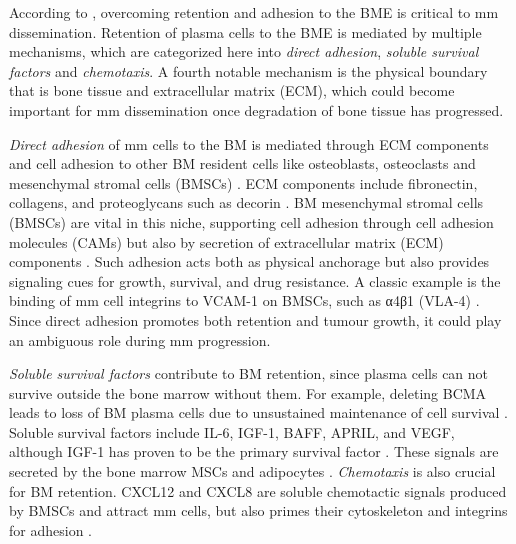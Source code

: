%
\label{sec:intro_myeloma_retention}%
According to \citet{zeissigTumourDisseminationMultiple2020}, overcoming
retention and adhesion to the BME is critical to \ac{mm} dissemination. Retention of
plasma cells to the BME is mediated by multiple mechanisms, which are
categorized here into \emph{direct adhesion}, \emph{soluble survival factors}
and \emph{chemotaxis}. A fourth notable mechanism is the physical boundary that
is bone tissue and extracellular matrix (ECM), which could become important for
\ac{mm} dissemination once degradation of bone tissue has progressed.

\emph{Direct adhesion} of \ac{mm} cells to the BM is mediated through ECM components
and cell adhesion to other BM resident cells like osteoblasts, osteoclasts and
mesenchymal stromal cells (BMSCs) \cite{bouzerdanAdhesionMoleculesMultiple2022}.
ECM components include fibronectin, collagens, and proteoglycans such as decorin
\cite{huDecorinmediatedSuppressionTumorigenesis2021,
    huangHigherDecorinLevels2015,katzAdhesionMoleculesLifelines2010,
    kiblerAdhesiveInteractionsHuman1998}. BM mesenchymal stromal cells (BMSCs) are
vital in this niche, supporting cell adhesion through cell adhesion molecules
(CAMs) but also by secretion of extracellular matrix (ECM) components
\cite{katzAdhesionMoleculesLifelines2010}. Such adhesion acts both as physical
anchorage but also provides signaling cues for growth, survival, and drug
resistance. A classic example is the binding of \ac{mm} cell integrins to VCAM-1 on
BMSCs, such as α4β1 (VLA-4) \cite{bouzerdanAdhesionMoleculesMultiple2022}.
Since direct adhesion promotes both retention and tumour growth, it could play
an ambiguous role during \ac{mm} progression.

\emph{Soluble survival factors} contribute to BM retention, since plasma cells
can not survive outside the bone marrow without them. For example, deleting BCMA
 leads to loss of BM plasma
cells due to unsustained maintenance of cell survival
\cite{oconnorBCMAEssentialSurvival2004}. Soluble survival factors include IL-6,
IGF-1, BAFF, APRIL, and VEGF, although IGF-1 has proven to be the primary
survival factor \cite{sprynskiRoleIGF1Major2009}. These signals are secreted by
the bone marrow MSCs and adipocytes \cite{kiblerAdhesiveInteractionsHuman1998,
    garcia-ortizRoleTumorMicroenvironment2021}. \emph{Chemotaxis} is also crucial
for BM retention. CXCL12 and CXCL8 are soluble chemotactic signals produced by
BMSCs and attract \ac{mm} cells, but also primes their cytoskeleton and integrins for
adhesion \cite{aggarwalChemokinesMultipleMyeloma2006,
    alsayedMechanismsRegulationCXCR42007}.

